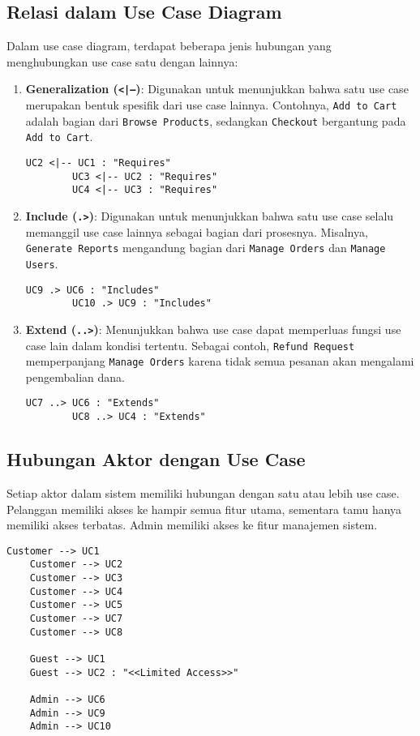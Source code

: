 \subsection{Relasi dalam Use Case Diagram}
Dalam use case diagram, terdapat beberapa jenis hubungan yang menghubungkan use case satu dengan lainnya:
\begin{enumerate}
	\item \textbf{Generalization (\texttt{<|--})}: Digunakan untuk menunjukkan bahwa satu use case merupakan bentuk spesifik dari use case lainnya. Contohnya, \texttt{Add to Cart} adalah bagian dari \texttt{Browse Products}, sedangkan \texttt{Checkout} bergantung pada \texttt{Add to Cart}.
	\begin{lstlisting}[language=puml]
		UC2 <|-- UC1 : "Requires"
		UC3 <|-- UC2 : "Requires"
		UC4 <|-- UC3 : "Requires"
	\end{lstlisting}
	
	\item \textbf{Include (\texttt{.>})}: Digunakan untuk menunjukkan bahwa satu use case selalu memanggil use case lainnya sebagai bagian dari prosesnya. Misalnya, \texttt{Generate Reports} mengandung bagian dari \texttt{Manage Orders} dan \texttt{Manage Users}.
	\begin{lstlisting}[language=puml]
		UC9 .> UC6 : "Includes"
		UC10 .> UC9 : "Includes"
	\end{lstlisting}
	
	\item \textbf{Extend (\texttt{..>})}: Menunjukkan bahwa use case dapat memperluas fungsi use case lain dalam kondisi tertentu. Sebagai contoh, \texttt{Refund Request} memperpanjang \texttt{Manage Orders} karena tidak semua pesanan akan mengalami pengembalian dana.
	\begin{lstlisting}[language=puml]
		UC7 ..> UC6 : "Extends"
		UC8 ..> UC4 : "Extends"
	\end{lstlisting}
\end{enumerate}

\subsection{Hubungan Aktor dengan Use Case}
Setiap aktor dalam sistem memiliki hubungan dengan satu atau lebih use case. Pelanggan memiliki akses ke hampir semua fitur utama, sementara tamu hanya memiliki akses terbatas. Admin memiliki akses ke fitur manajemen sistem.

\begin{lstlisting}[language=puml]
	Customer --> UC1
	Customer --> UC2
	Customer --> UC3
	Customer --> UC4
	Customer --> UC5
	Customer --> UC7
	Customer --> UC8
	
	Guest --> UC1
	Guest --> UC2 : "<<Limited Access>>"
	
	Admin --> UC6
	Admin --> UC9
	Admin --> UC10
\end{lstlisting}

